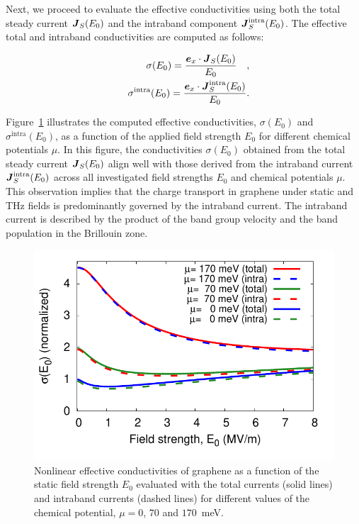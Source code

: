 Next, we proceed to evaluate the effective conductivities using both the total steady current
$\boldsymbol J_S(E_0)$ and the intraband component $\boldsymbol J^{\mathrm{intra}}_S(E_0)$. The effective total
and intraband conductivities are computed as follows:

\begin{align}
\sigma(E_0)=\frac{\boldsymbol e_x\cdot \boldsymbol J_S(E_0)}{E_0} \quad,\\
\quad \sigma^{\mathrm{intra}}(E_0)=\frac{\boldsymbol e_x\cdot \boldsymbol J^{\mathrm{intra}}_S(E_0)}{E_0}.
\end{align}

Figure~\ref{fig:conductivity} illustrates the computed effective conductivities, $\sigma(E_0)$ and $\sigma^{\mathrm{intra}}(E_0)$, as a function of the applied field strength $E_0$ for different chemical potentials $\mu$. In this figure, the conductivities $\sigma(E_0)$ obtained from the total steady current $\boldsymbol J_S(E_0)$ align well with those derived from the intraband current $ \boldsymbol J^{\mathrm{intra}}_S(E_0)$ across all investigated field strengths $E_0$ and chemical potentials $\mu$. This observation implies that the charge transport in graphene under static and THz fields is predominantly governed by the intraband current. The intraband current is described by the product of the band group velocity and the band population in the Brillouin zone.

\begin{figure}[htb]
    \centering
\includegraphics[width=0.8 \linewidth]{pic/sigma_vs_E0.pdf}
\caption{\label{fig:conductivity} 
Nonlinear effective conductivities of graphene as a function of the static field strength $E_0$ evaluated with the total currents (solid lines) and intraband currents (dashed lines) for different values of the chemical potential, $\mu = 0$, $70$ and $170$~meV.}
\end{figure}

